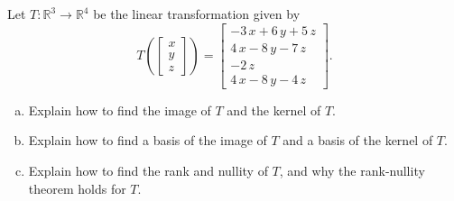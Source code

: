 
\begin{exerciseStatement}
 Let \(T:\mathbb{R}^ 3  \to \mathbb{R}^ 4 \) be the linear transformation given by \[T\left(  \left[\begin{array}{c}
x \\
y \\
z
\end{array}\right]  \right) =  \left[\begin{array}{c}
-3 \, x + 6 \, y + 5 \, z \\
4 \, x - 8 \, y - 7 \, z \\
-2 \, z \\
4 \, x - 8 \, y - 4 \, z
\end{array}\right] .\]
\begin{enumerate}[(a)]
\item Explain how to find the image of \(T\) and the kernel of \(T\).
\item Explain how to find a basis of the image of \(T\) and a basis of the kernel of \(T\).
\item Explain how to find the rank and nullity of \(T\), and why the rank-nullity theorem holds for \(T\).
\end{enumerate}
    
\end{exerciseStatement}
    
